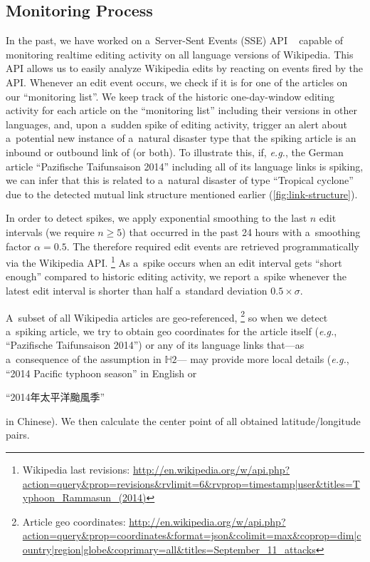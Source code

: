 \documentclass[runningheads,a4paper]{llncs}
\begin{document}
\subsection{Monitoring Process}
\label{sec:monitoring-process}

In the past, we have worked on a~Server-Sent Events (SSE) API%
~\cite{steiner2014bots} capable of monitoring realtime editing activity
on all language versions of Wikipedia.
This API allows us to easily analyze Wikipedia edits
by reacting on events fired by the API.
Whenever an edit event occurs, we check if it is for one of the articles
on our ``monitoring list''. 
We keep track of the historic one-day-window editing activity
for each article on the ``monitoring list'' including their versions in other languages,
and, upon a~sudden spike of editing activity,
trigger an alert about a~potential new instance of a~natural disaster type
that the spiking article is an inbound or outbound link of (or both).
To illustrate this, if, \emph{e.g.}, the German article
``Pazifische Taifunsaison 2014'' including all of its language links is spiking,
we can infer that this is related to a~natural disaster
of type ``Tropical cyclone'' due to the detected
mutual link structure mentioned earlier (\autoref{fig:link-structure}).

In order to detect spikes, we apply exponential smoothing
to the last $n$ edit intervals (we require $n\geq5$) that occurred in the past 24 hours
with a~smoothing factor $\alpha = 0.5$.
The therefore required edit events are retrieved programmatically via the Wikipedia API.%
\footnote{Wikipedia last revisions:
\url{http://en.wikipedia.org/w/api.php?action=query&prop=revisions&rvlimit=6&rvprop=timestamp|user&titles=Typhoon_Rammasun_(2014)}}
As a~spike occurs when an edit interval gets ``short enough''
compared to historic editing activity,
we report a~spike whenever the latest edit interval
is shorter than half a~standard deviation $0.5 \times \sigma$.

A~subset of all Wikipedia articles are geo-referenced,%
\footnote{Article geo coordinates:
\url{http://en.wikipedia.org/w/api.php?action=query&prop=coordinates&format=json&colimit=max&coprop=dim|country|region|globe&coprimary=all&titles=September_11_attacks}}
so when we detect a~spiking article,
we try to obtain geo coordinates for the article itself
(\emph{e.g.}, ``Pazifische Taifunsaison 2014'')
or any of its language links
that---as a~consequence of the assumption in $\mathbb{H}2$---%
may provide more local details
(\emph{e.g.}, ``2014 Pacific typhoon season'' in English or
\begin{CJK*}{UTF8}{gbsn}``2014年太平洋颱風季''\end{CJK*} in Chinese).
We then calculate the center point of all obtained latitude/longitude pairs.
\end{document}
